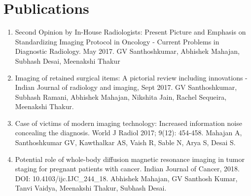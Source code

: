 \documentclass[a4paper,10pt]{article}
\begin{document}
\section{Publications}
\begin{enumerate}
  \vspace{0.1cm}\item Second Opinion by In-House Radiologists: Present Picture and Emphasis on Standardizing Imaging Protocol in Oncology - Current Problems in Diagnostic Radiology. May 2017. GV Santhoshkumar, Abhishek Mahajan, Subhash Desai, Meenakshi Thakur
  \vspace{-0.1cm}\item Imaging of retained surgical items: A pictorial review including innovations -Indian Journal of radiology and imaging, Sept 2017. GV Santhoshkumar, Subhash Ramani, Abhishek Mahajan, Nikshita Jain, Rachel Sequeira, Meenakshi Thakur.
  \vspace{-0.1cm}\item Case of victims of modern imaging technology: Increased information noise concealing the diagnosis. World J Radiol 2017; 9(12): 454-458. Mahajan A, Santhoshkumar GV, Kawthalkar AS, Vaish R, Sable N, Arya S, Desai S.
  \vspace{-0.1cm}\item Potential role of whole-body diffusion magnetic resonance imaging in tumor staging for pregnant patients with cancer. Indian Journal of Cancer, 2018. DOI: 10.4103/ijc.IJC\_244\_18. Abhishek Mahajan, GV Santhosh Kumar, Tanvi Vaidya, Meenakshi Thakur, Subhash Desai.
\end{enumerate}

\end{document}
